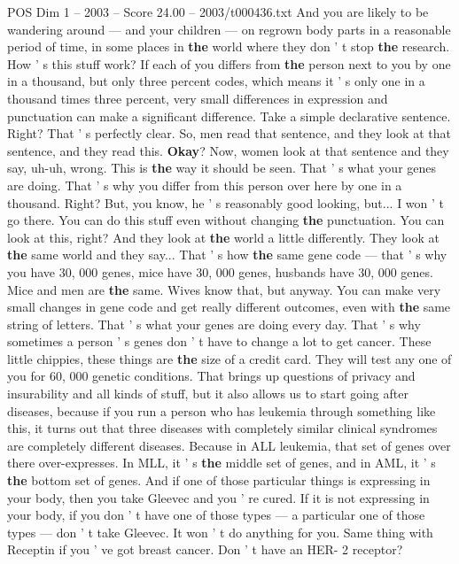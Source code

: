 \begin{textsample}{POS Dim 1 – 2003 – Score 24.00 – 2003/t000436.txt}
And you are likely to be wandering around — and your children — on regrown body parts in a reasonable period of time, in some places in \textbf{the} world where they don ' t stop \textbf{the} research.
How ' s this stuff work?
If each of you differs from \textbf{the} person next to you by one in a thousand, but only three percent codes, which means it ' s only one in a thousand times three percent, very small differences in expression and punctuation can make a significant difference.
Take a simple declarative sentence.
Right?
That ' s perfectly clear.
So, men read that sentence, and they look at that sentence, and they read this. \textbf{Okay}?
Now, women look at that sentence and they say, uh-uh, wrong.
This is \textbf{the} way it should be seen.
That ' s what your genes are doing.
That ' s why you differ from this person over here by one in a thousand.
Right?
But, you know, he ' s reasonably good looking, but...
I won ' t go there.
You can do this stuff even without changing \textbf{the} punctuation.
You can look at this, right?
And they look at \textbf{the} world a little differently.
They look at \textbf{the} same world and they say...
That ' s how \textbf{the} same gene code — that ' s why you have 30, 000 genes, mice have 30, 000 genes, husbands have 30, 000 genes.
Mice and men are \textbf{the} same.
Wives know that, but anyway.
You can make very small changes in gene code and get really different outcomes, even with \textbf{the} same string of letters.
That ' s what your genes are doing every day.
That ' s why sometimes a person ' s genes don ' t have to change a lot to get cancer.
These little chippies, these things are \textbf{the} size of a credit card.
They will test any one of you for 60, 000 genetic conditions.
That brings up questions of privacy and insurability and all kinds of stuff, but it also allows us to start going after diseases, because if you run a person who has leukemia through something like this, it turns out that three diseases with completely similar clinical syndromes are completely different diseases.
Because in ALL leukemia, that set of genes over there over-expresses.
In MLL, it ' s \textbf{the} middle set of genes, and in AML, it ' s \textbf{the} bottom set of genes.
And if one of those particular things is expressing in your body, then you take Gleevec and you ' re cured.
If it is not expressing in your body, if you don ' t have one of those types — a particular one of those types — don ' t take Gleevec.
It won ' t do anything for you.
Same thing with Receptin if you ' ve got breast cancer.
Don ' t have an HER- 2 receptor?

\end{textsample}
